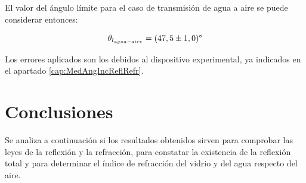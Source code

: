 \documentclass[a4paper,twocolumn]{article}
\begin{document}
        El valor del ángulo límite para el caso de transmisión de agua a aire se puede considerar entonces:
        
        $$ \theta_{l_{agua-aire}} = (47,5 \pm 1,0)\text{\textdegree} $$	

        Los errores aplicados son los debidos al dispositivo experimental, ya indicados en el apartado \ref{cap:MedAngIncReflRefr}.
	
	\section{Conclusiones}

    
    
    Se analiza a continuación si los resultados obtenidos sirven para comprobar las leyes de la reflexión y la refracción, para constatar la existencia de la reflexión total y para determinar el índice de refracción del vidrio y del agua respecto del aire.
    
\end{document}
